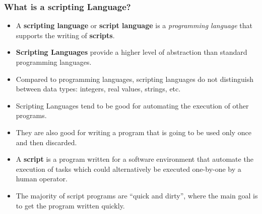 \documentclass[slidestop,mathserif,compress,xcolor=svgnames]{beamer}
\newcommand*\vardiamond{\textcolor{tigerspurple}{%
  \ensuremath{\blacklozenge}}}
\newenvironment{eblock}[0]
{
\begin{beamerboxesrounded}[upper=uppercol2,lower=lowercol2,shadow=true]}
{\end{beamerboxesrounded}}
\begin{document}
\begin{frame}
  \frametitle{\small What is a scripting Language?}
  \begin{eblock}{}%
    {\scriptsize
    \begin{itemize}
      \item A \textbf{scripting language} or \textbf{script language} is a \emph{programming language} that supports the writing of \textbf{scripts}.
      \item \textbf{Scripting Languages} provide a higher level of abstraction than standard programming languages.
      \item Compared to programming languages, scripting languages do not distinguish between data types: integers, real values, strings, etc.
      \item Scripting Languages tend to be good for automating the execution of other programs.
      \item They are also good for writing a program that is going to be used only once and then discarded.
      \item A \textbf{script} is a program written for a software environment that automate the execution of tasks which could alternatively be executed one-by-one by a human operator.
      \item The majority of script programs are ``quick and dirty'', where the main goal is to get the program written quickly.
    \end{itemize}
    }
  \end{eblock}
\end{frame}
\end{document}
